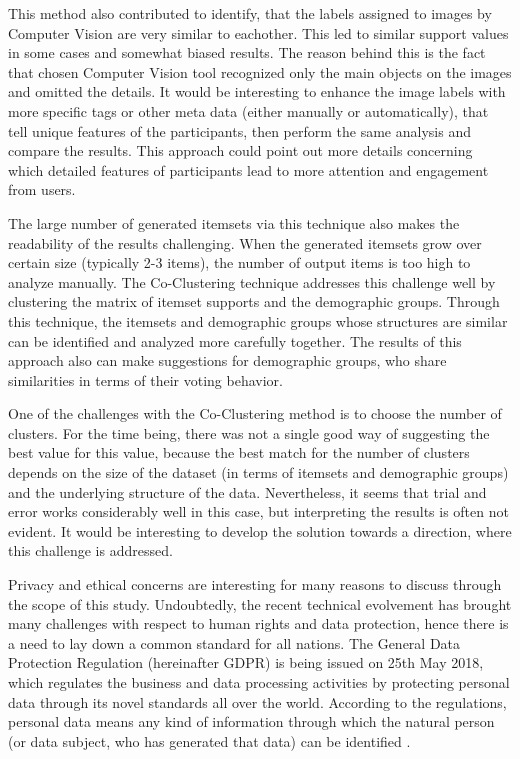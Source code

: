This method also contributed to identify, that the labels assigned to images by Computer Vision are very similar to eachother. This led to similar support values in some cases and somewhat biased results. The reason behind this is the fact that chosen Computer Vision tool recognized only the main objects on the images and omitted the details. It would be interesting to enhance the image labels with more specific tags or other meta data (either manually or automatically), that tell unique features of the participants, then perform the same analysis and compare the results. This approach could point out more details concerning which detailed features of participants lead to more attention and engagement from users.

The large number of generated itemsets via this technique also makes the readability of the results challenging. When the generated itemsets grow over certain size (typically 2-3 items), the number of output items is too high to analyze manually. The Co-Clustering technique addresses this challenge well by clustering the matrix of itemset supports and the demographic groups. Through this technique, the itemsets and demographic groups whose structures are similar can be identified and analyzed more carefully together. The results of this approach also can make suggestions for demographic groups, who share similarities in terms of their voting behavior.

One of the challenges with the Co-Clustering method is to choose the number of clusters. For the time being, there was not a single good way of suggesting the best value for this value, because the best match for the number of clusters depends on the size of the dataset (in terms of itemsets and demographic groups) and the underlying structure of the data. Nevertheless, it seems that trial and error works considerably well in this case, but interpreting the results is often not evident. It would be interesting to develop the solution towards a direction, where this challenge is addressed.

Privacy and ethical concerns are interesting for many reasons to discuss through the scope of this study. Undoubtedly, the recent technical evolvement has brought many challenges with respect to human rights and data protection, hence there is a need to lay down a common standard for all nations. The General Data Protection Regulation (hereinafter GDPR) \cite{gdpr} is being issued on 25th May 2018, which regulates the business and data processing activities by protecting personal data through its novel standards all over the world. According to the regulations, personal data means any kind of information through which the natural person (or data subject, who has generated that data) can be identified \cite{gdpr}. 

